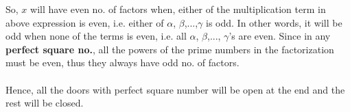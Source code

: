 \documentclass[12pt]{report}
\begin{document}
So, $x$ will have even no. of factors when, either of the multiplication term in above expression is even, i.e. either of $\alpha$, $\beta$,...,$\gamma$ is odd. In other words, it will be odd when none of the terms is even, i.e. all $\alpha$, $\beta$,..., $\gamma$'s are even. 
Since in any \textbf{perfect square no.}, all the powers of the prime numbers in the factorization must be even, thus they always have odd no. of factors. 
\\ \\
Hence, all the doors with perfect square number will be open at the end and the rest will be closed. 
\end{document}
